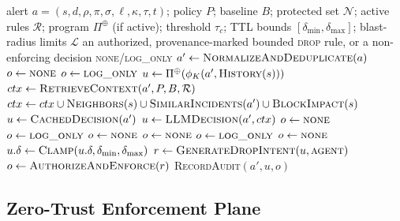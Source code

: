 \documentclass[final,5p]{elsarticle}
\begin{document}
\begin{algorithm}[!t]
\caption{Fail-closed bounded-isolation decision}
\label{alg:decision}
\small
\begin{algorithmic}[1]
\Require alert $a=(s,d,\rho,\pi,\sigma,\ell,\kappa,\tau,t)$; policy $P$; baseline $B$; protected set $\mathcal{N}$; active rules $\mathcal{R}$; program $\Pi^{\oplus}$ (if active); threshold $\tau_c$; TTL bounds $[\delta_{\min},\delta_{\max}]$; blast-radius limits $\mathcal{L}$
\Ensure an authorized, provenance-marked bounded \textsc{drop} rule, or a non-enforcing decision \textsc{none}/\textsc{log\_only}
\State $a' \gets \textsc{NormalizeAndDeduplicate}(a)$
    \State $o \gets \textsc{none}$
    \State $o \gets \textsc{log\_only}$
\Else
    \State $u \gets \Pi^{\oplus}(\phi_K(a',\textsc{History}(s)))$ 
     
        \State $ctx \gets \textsc{RetrieveContext}(a',P,B,\mathcal{R})$
        \State $ctx \gets ctx \cup \textsc{Neighbors}(s) \cup \textsc{SimilarIncidents}(a') \cup \textsc{BlockImpact}(s)$
            \State $u \gets \textsc{CachedDecision}(a')$
        \Else
            \State $u \gets \textsc{LLMDecision}(a',ctx)$
        \EndIf
    \EndIf
        \State $o \gets \textsc{none}$
        \State $o \gets \textsc{log\_only}$
        \State $o \gets \textsc{none}$
        \State $o \gets \textsc{none}$
        \State $o \gets \textsc{log\_only}$
        \State $o \gets \textsc{none}$
    \Else
        \State $u.\delta \gets \textsc{Clamp}(u.\delta,\delta_{\min},\delta_{\max})$
        \State $r \gets \textsc{GenerateDropIntent}(u,\textsc{agent})$
        \State $o \gets \textsc{AuthorizeAndEnforce}(r)$
    \EndIf
\EndIf
\State \textsc{RecordAudit}$(a',u,o)$
\end{algorithmic}
\end{algorithm}

\subsection{Zero-Trust Enforcement Plane}
\label{sec:enforcement_plane}
\end{document}
